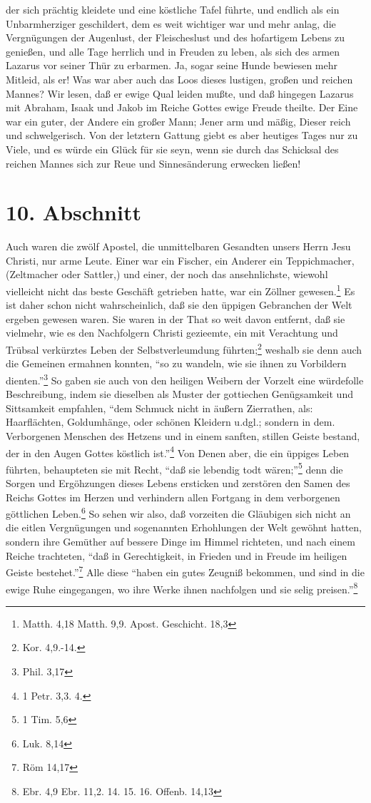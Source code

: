 der sich prächtig kleidete und eine köstliche Tafel führte, und endlich als ein Unbarmherziger geschildert, dem es weit wichtiger war und mehr anlag, die Vergnügungen der Augenlust, der Fleischeslust und des hofartigem Lebens zu genießen, und alle Tage herrlich und in Freuden zu leben, als sich des armen Lazarus vor seiner Thür zu erbarmen. Ja, sogar seine Hunde bewiesen mehr Mitleid, als er! Was war aber auch das Loos dieses lustigen, großen und reichen Mannes? Wir lesen, daß er ewige Qual leiden mußte, und daß hingegen Lazarus mit Abraham, Isaak und Jakob im Reiche Gottes ewige Freude theilte. Der Eine war ein guter, der Andere ein großer Mann; Jener arm und mäßig, Dieser reich und schwelgerisch. Von der letztern Gattung giebt es aber heutiges Tages nur zu Viele, und es würde ein Glück für sie seyn, wenn sie durch das Schicksal des reichen Mannes sich zur Reue und Sinnesänderung erwecken ließen!

\section{10. Abschnitt}

Auch waren die zwölf Apostel, die unmittelbaren Gesandten unsers Herrn Jesu Christi, nur arme Leute. Einer war ein Fischer, ein Anderer ein Teppichmacher, (Zeltmacher oder Sattler,) und einer, der noch das ansehnlichste, wiewohl vielleicht nicht das beste Geschäft getrieben hatte, war ein Zöllner gewesen.\footnote{Matth. 4,18 Matth. 9,9. Apost. Geschicht. 18,3} Es ist daher schon nicht wahrscheinlich, daß sie den üppigen Gebranchen der Welt ergeben gewesen waren. Sie waren in der That so weit davon entfernt, daß sie vielmehr, wie es den Nachfolgern Christi gezieemte, ein mit Verachtung und Trübsal verkürztes Leben der Selbstverleumdung führten;\footnote{Kor. 4,9.-14.} weshalb sie denn auch die Gemeinen ermahnen konnten, "`so zu wandeln, wie sie ihnen zu Vorbildern dienten."'\footnote{Phil. 3,17} So gaben sie auch von den heiligen Weibern der Vorzelt eine würdefolle Beschreibung, indem sie dieselben als Muster der gottiechen Genügsamkeit und Sittsamkeit empfahlen, "`dem Schmuck nicht in äußern Zierrathen, als: Haarflächten, Goldumhänge, oder schönen Kleidern u.dgl.; sondern in dem. Verborgenen Menschen des Hetzens und in einem sanften, stillen Geiste bestand, der in den Augen Gottes köstlich ist."'\footnote{1 Petr. 3,3. 4.} Von Denen aber, die ein üppiges Leben führten, behaupteten sie mit Recht, "`daß sie lebendig todt wären;"'\footnote{1 Tim. 5,6} denn die Sorgen und Ergöhzungen dieses Lebens ersticken und zerstören den Samen des Reichs Gottes im Herzen und verhindern allen Fortgang in dem verborgenen göttlichen Leben.\footnote{Luk. 8,14} So sehen wir also, daß vorzeiten die Gläubigen sich nicht an die eitlen Vergnügungen und sogenannten Erhohlungen der Welt gewöhnt hatten, sondern ihre Gemüther auf bessere Dinge im Himmel richteten, und nach einem Reiche trachteten, "`daß in Gerechtigkeit, in Frieden und in Freude im heiligen Geiste bestehet."'\footnote{Röm 14,17} Alle diese "`haben ein gutes Zeugniß bekommen, und sind in die ewige Ruhe eingegangen, wo ihre Werke ihnen nachfolgen und sie selig preisen."'\footnote{Ebr. 4,9 Ebr. 11,2. 14. 15. 16. Offenb. 14,13}

